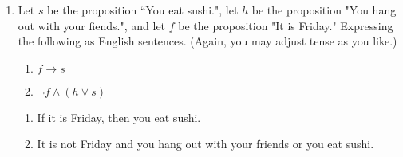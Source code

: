 \begin{enumerate}
    \item Let $s$ be the proposition ``You eat sushi.", let $h$ be the proposition "You hang out with your fiends.", and let $f$ be the proposition "It is Friday." Expressing the following as English sentences. (Again, you may adjust tense as you like.) 
    \begin{enumerate}
        \item $f \rightarrow s$
        \item $\lnot f \wedge (h \vee s)$
    \end{enumerate}
    \begin{solution}
        \begin{enumerate}
            \item If it is Friday, then you eat sushi.
            \item It is not Friday and you hang out with your friends or you eat sushi.
        \end{enumerate}
    \end{solution}
    






















\end{enumerate}
